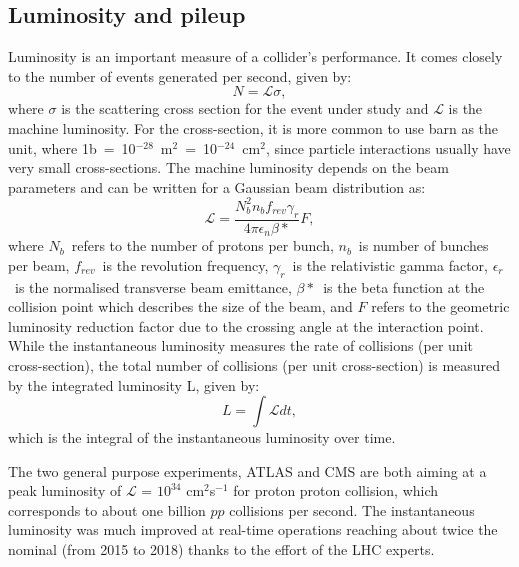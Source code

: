 \subsection{Luminosity and pileup}
\label{sec:LHC:pileup}
Luminosity is an important measure of a collider's performance.
It comes closely to the number of events generated per second, given by:
\[
	N = \mathcal{L}\sigma,
\]
where $\sigma$ is the scattering cross section 
for the event under study and $\mathcal{L}$ is the machine luminosity. 
For the cross-section, it is more common to use barn as the unit, 
where 1b~=~10$^{-28}$~m$^2$~=~10$^{-24}$~cm$^2$, 
since particle interactions usually have very small cross-sections. 
The machine luminosity depends on the beam parameters 
and can be written for a Gaussian beam distribution as:
\[
	\mathcal{L} = \frac{N_b^2 n_b f_{rev} \gamma_r}{4\pi \epsilon_n \beta*} F,
\]
where $N_b$~refers to the number of protons per bunch,
$n_b$~is number of bunches per beam,
$f_{rev}$~is the revolution frequency, 
$\gamma_r$~is the relativistic gamma factor, 
$\epsilon_r$~is the normalised transverse beam emittance, 
$\beta*$~is the beta function at the collision point which
describes the size of the beam, 
and	$F$ refers to the geometric luminosity reduction factor due to the 
crossing angle at the interaction point. 
While the instantaneous luminosity measures the rate of collisions (per unit cross-section), 
the total number of collisions (per unit cross-section) is measured by the integrated luminosity L, 
given by:
\[
	L = \int \mathcal{L} dt,
\]
which is the integral of the instantaneous luminosity over time.

The two general purpose experiments, ATLAS and CMS are
both aiming at a peak luminosity of $\mathcal{L}$ = $10^{34}$ cm$^2$s$^{-1}$ for proton proton collision,
which corresponds to about one billion $pp$ collisions per second. 
The instantaneous luminosity was much improved at real-time operations reaching about 
twice the nominal (from 2015 to 2018) thanks to the effort of the LHC experts. 


